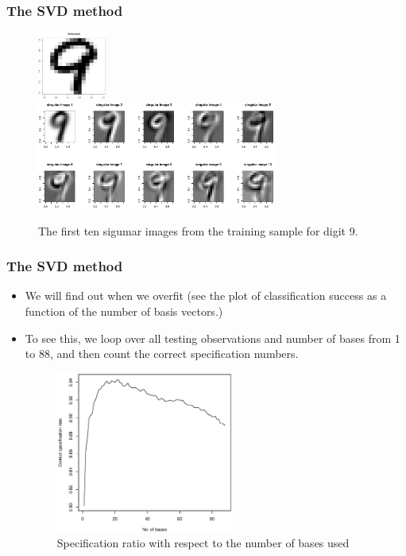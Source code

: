 \documentclass[10pt]{beamer}
\begin{document}
\begin{frame}
\frametitle{The SVD method}

\begin{figure}[h]
  \centering
  \label{fig:test9}
\end{figure}
\begin{figure}
  \centering
  \includegraphics[width=0.2\textwidth]{test9.eps}\\
  \includegraphics[width=0.7\textwidth]{singular-img-9.eps}
  \caption{The first ten sigumar images from the training sample for digit 9.}
  \label{fig:svdimg}
\end{figure}

\end{frame}


\begin{frame}
  \frametitle{The SVD method}

  \begin{itemize}
  \item We will find out when we overfit (see the plot of classification
    success as a function of the number of basis vectors.)

  \item To see this, we loop over all testing observations and number of bases
    from 1 to 88, and then count the correct specification numbers.


\begin{figure}
  \centering
  \includegraphics[width=0.55\textwidth]{CorrectSpect.eps}
  \caption{Specification ratio with respect to the number of bases used}
  \label{fig:bases}
\end{figure}


  \end{itemize}

\end{frame}
\end{document}
